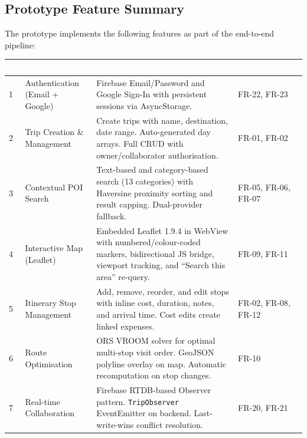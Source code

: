 \documentclass[12pt, a4paper]{article}
\newcommand{\thcell}[1]{\textcolor{white}{\textbf{\small #1}}}
\newcommand{\code}[1]{\texttt{\small #1}}
\newcommand{\reqid}[1]{\textsc{\small #1}}
\begin{document}
\subsection{Prototype Feature Summary}

The prototype implements the following features as part of the end-to-end pipeline:

\begin{longtable}{C{0.5cm} L{3.5cm} L{5.5cm} C{3.5cm}}
\toprule
{}
\thcell{\#} & \thcell{Feature} & \thcell{Description} & \thcell{Requirements} \\
\midrule
\endhead
\bottomrule
\endfoot

1 & Authentication (Email + Google) & Firebase Email/Password and Google Sign-In with persistent sessions via AsyncStorage. & \reqid{FR-22}, \reqid{FR-23} \\

2 & Trip Creation \& Management & Create trips with name, destination, date range. Auto-generated day arrays. Full CRUD with owner/collaborator authorisation. & \reqid{FR-01}, \reqid{FR-02} \\

3 & Contextual POI Search & Text-based and category-based search (13 categories) with Haversine proximity sorting and result capping. Dual-provider fallback. & \reqid{FR-05}, \reqid{FR-06}, \reqid{FR-07} \\

4 & Interactive Map (Leaflet) & Embedded Leaflet 1.9.4 in WebView with numbered/colour-coded markers, bidirectional JS bridge, viewport tracking, and ``Search this area'' re-query. & \reqid{FR-09}, \reqid{FR-11} \\

5 & Itinerary Stop Management & Add, remove, reorder, and edit stops with inline cost, duration, notes, and arrival time. Cost edits create linked expenses. & \reqid{FR-02}, \reqid{FR-08}, \reqid{FR-12} \\

6 & Route Optimisation & ORS VROOM solver for optimal multi-stop visit order. GeoJSON polyline overlay on map. Automatic recomputation on stop changes. & \reqid{FR-10} \\

7 & Real-time Collaboration & Firebase RTDB-based Observer pattern. \code{TripObserver} EventEmitter on backend. Last-write-wins conflict resolution. & \reqid{FR-20}, \reqid{FR-21} \\


\end{longtable}
\end{document}
